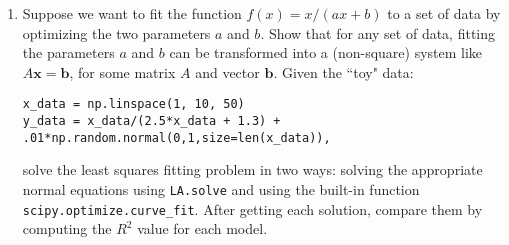 \documentclass[10pt]{article}
\begin{document}
\begin{enumerate}[{$\qquad 1.]
\begin{enumerate}
\end{enumerate}

\item Suppose we want to fit the function $f(x) = x/(ax + b)$ to a set of data by optimizing the two parameters $a$ and $b$.  Show that for any set of data, fitting the parameters $a$ and $b$ can be transformed into a (non-square) system like $A\boldsymbol{x} = \boldsymbol{b}$, for some matrix $A$ and vector $\boldsymbol{b}$.  Given the ``toy" data:
\begin{verbatim}
x_data = np.linspace(1, 10, 50)
y_data = x_data/(2.5*x_data + 1.3) + .01*np.random.normal(0,1,size=len(x_data)),\end{verbatim} 
solve the least squares fitting problem in two ways: solving the appropriate normal equations using \texttt{LA.solve} and using the built-in function \verb|scipy.optimize.curve_fit|.  After getting each solution, compare them by computing the $R^2$ value for each model.  

%


\end{enumerate}
\end{document}
